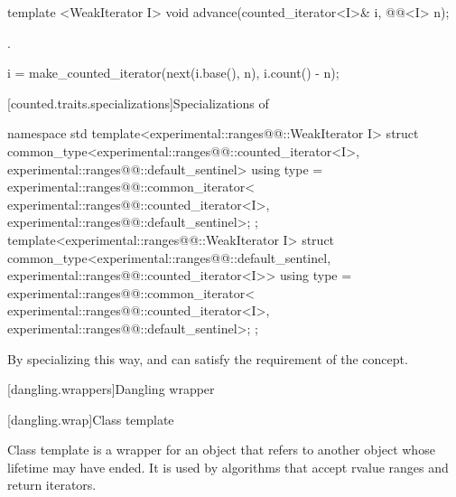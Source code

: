 \begin{addedblock}
%
\begin{itemdecl}
template <WeakIterator I>
  void advance(counted_iterator<I>& i, @@<I> n);
\end{itemdecl}

\begin{itemdescr}
\pnum
\requires {}.

\pnum
\effects
\begin{codeblock}
i = make_counted_iterator(next(i.base(), n), i.count() - n);
\end{codeblock}
\end{itemdescr}

[counted.traits.specializations]{Specializations of }

%
\begin{itemdecl}
namespace std {
  template<experimental::ranges@@::WeakIterator I>
  struct common_type<experimental::ranges@@::counted_iterator<I>,
                     experimental::ranges@@::default_sentinel> {
    using type = experimental::ranges@@::common_iterator<
      experimental::ranges@@::counted_iterator<I>,
      experimental::ranges@@::default_sentinel>;
  };
  template<experimental::ranges@@::WeakIterator I>
  struct common_type<experimental::ranges@@::default_sentinel,
                     experimental::ranges@@::counted_iterator<I>> {
    using type = experimental::ranges@@::common_iterator<
      experimental::ranges@@::counted_iterator<I>,
      experimental::ranges@@::default_sentinel>;
  };
}
\end{itemdecl}

\begin{itemdescr}
\pnum
\enternote By specializing  this way, 
and  can satisfy the  requirement of the
 concept.\exitnote
\end{itemdescr}

[dangling.wrappers]{Dangling wrapper}

[dangling.wrap]{Class template }

\pnum
{}%
Class template  is a wrapper for an object that refers to another object whose
lifetime may have ended. It is used by algorithms that accept rvalue ranges and return iterators.


\end{addedblock}

